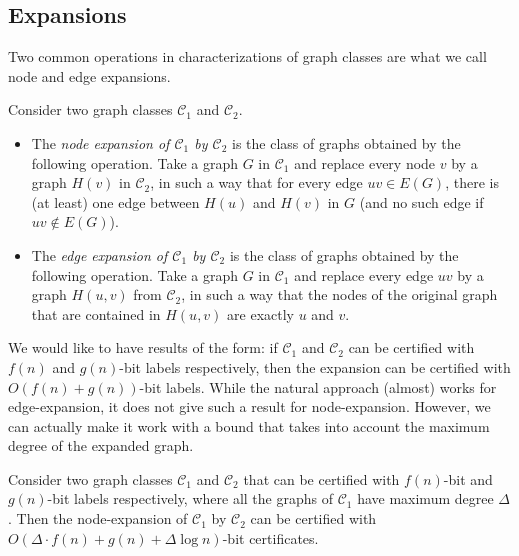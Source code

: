 \documentclass[a4paper,thm-restate,USenglish]{lipics-v2019}
\begin{document}
\subsection{Expansions}

Two common operations in characterizations of graph classes are what we call node and edge expansions.

\begin{definition}
Consider two graph classes $\mathcal{C}_1$ and $\mathcal{C}_2$.
\begin{itemize}
    \item The \emph{node expansion of $\mathcal{C}_1$ by $\mathcal{C}_2$} is the class of graphs obtained by the following operation. Take a graph $G$ in $\mathcal{C}_1$ and replace every node $v$ by a graph $H(v)$ in $\mathcal{C}_2$, in such a way that for every edge $uv\in E(G)$, there is (at least) one edge between $H(u)$ and $H(v)$ in $G$ (and no such edge if $uv\notin E(G)$). 
    \item The \emph{edge expansion of $\mathcal{C}_1$ by $\mathcal{C}_2$} is the class of graphs obtained by the following operation. Take a graph $G$ in $\mathcal{C}_1$ and replace every edge $uv$ by a graph $H(u,v)$ from $\mathcal{C}_2$, in such a way that the nodes of the original graph that are contained in $H(u,v)$ are exactly $u$ and $v$.
\end{itemize}
\end{definition}

We would like to have results of the form: if $\mathcal{C}_1$ and $\mathcal{C}_2$ can be certified with $f(n)$ and $g(n)$-bit labels respectively, then the expansion can be certified with $O(f(n)+g(n))$-bit labels. 
While the natural approach (almost) works for edge-expansion, it does not give such a result for node-expansion. However, we can actually make it work with a bound that takes into account the maximum degree of the expanded graph.

\begin{proposition}
\label{prop:node-expansion}
Consider two graph classes $\mathcal{C}_1$ and $\mathcal{C}_2$ that can be certified with $f(n)$-bit and $g(n)$-bit labels respectively, where all the graphs of $\mathcal{C}_1$ have maximum degree $\Delta$. Then the node-expansion of $\mathcal{C}_1$ by $\mathcal{C}_2$ can be certified with $O(\Delta \cdot f(n)+g(n)+\Delta\log n)$-bit certificates.
\end{proposition}
\end{document}
